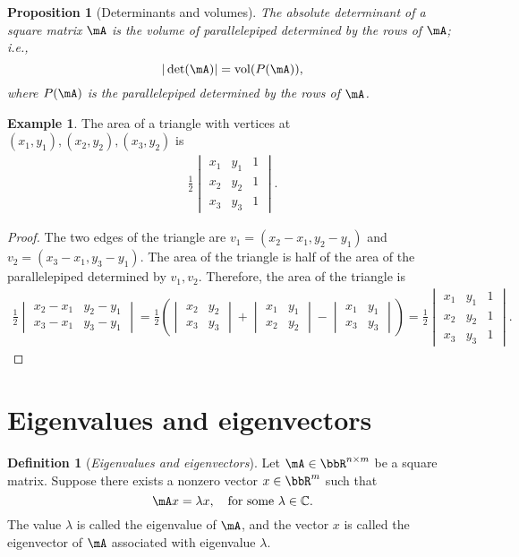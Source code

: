 \documentclass[11pt]{article}
\DeclareMathOperator{\vol}{vol}
\theoremstyle{plain}
\newtheorem{prop}{Proposition}
\theoremstyle{definition}
\newtheorem{defn}{Definition}
\newtheorem{example}{Example}
\begin{document}
\begin{prop}[Determinants and volumes]
The absolute determinant of a square matrix $\mA$ is the volume of parallelepiped determined by the rows of $\mA$; i.e.,
	\[ |\det(\mA)| = \vol(P(\mA)), \]
	where $P(\mA)$ is the parallelepiped determined by the rows of $\mA$.
\end{prop}

\begin{example}
	The area of a triangle with vertices at $(x_1,y_1), (x_2,y_2), (x_3,y_2)$ is
	\begin{align}
		\frac{1}{2} \begin{vmatrix}
			x_1 & y_1 & 1\\
			x_2 & y_2 & 1\\
			x_3 & y_3 & 1
		\end{vmatrix}.
	\end{align}
	
	\begin{proof}
		The two edges of the triangle are $v_1 = (x_2 - x_1, y_2 -y_1)$ and $v_2 = (x_3 - x_1, y_3 -y_1)$. The area of the triangle is half of the area of the parallelepiped determined by $v_1, v_2$. Therefore, the area of the triangle is 
		\begin{align}
			\frac{1}{2} \begin{vmatrix}
				x_2 - x_1 &  y_2 - y_1\\
				x_3 - x_1& y_3 -y_1
			\end{vmatrix} =  \frac{1}{2} \left(  \begin{vmatrix}
				x_2  &  y_2 \\
				x_3 & y_3
			\end{vmatrix} + \begin{vmatrix}
				x_1 &  y_1\\
				x_2& y_2
			\end{vmatrix}  - \begin{vmatrix}
				x_1 &  y_1\\
				x_3 & y_3 
			\end{vmatrix}    \right) = \frac{1}{2} \begin{vmatrix}
			x_1 & y_1 & 1\\
			x_2 & y_2 & 1\\
			x_3 & y_3 & 1
		\end{vmatrix}.
		\end{align}
	\end{proof}
\end{example}

\section{Eigenvalues and eigenvectors}
\begin{defn}[\textit{Eigenvalues and eigenvectors}]\label{def:eigen}
	Let $\mA \in \bbR^{n \times m}$ be a square matrix. Suppose there exists a nonzero vector $x \in \bbR^{m}$ such that
	\[ \mA x = \lambda x, \quad \text{for some } \lambda \in \mathbb{C}. \]
	The value $\lambda$ is called the eigenvalue of $\mA$, and the vector $x$ is called the eigenvector of $\mA$ associated with eigenvalue $\lambda$.
\end{defn}
\end{document}
